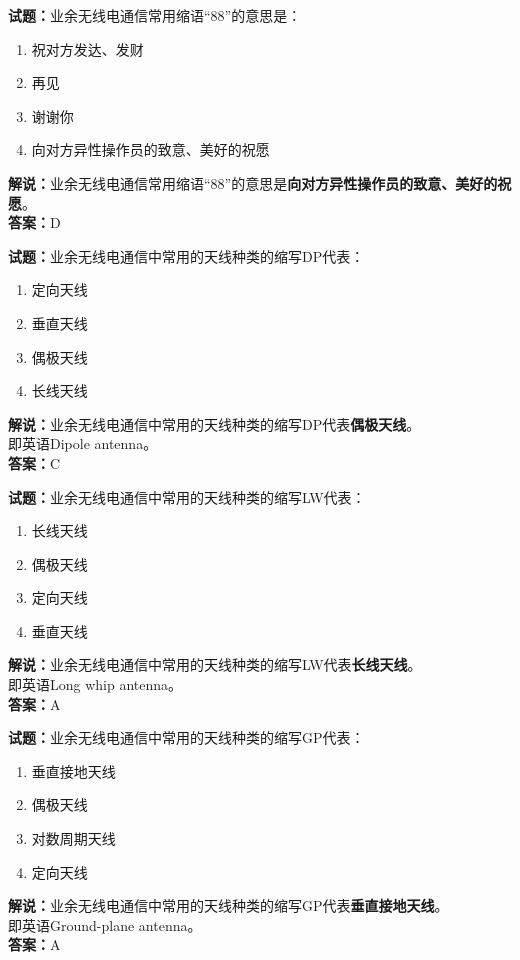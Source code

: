 \documentclass{ctexbook}
\begin{document}
\bigskip


\noindent\textbf{试题：}业余无线电通信常用缩语“88”的意思是：
\begin{enumerate}[leftmargin=3em]
\item 祝对方发达、发财
\item 再见
\item 谢谢你
\item 向对方异性操作员的致意、美好的祝愿
\end{enumerate}
\noindent\textbf{解说：}业余无线电通信常用缩语“88”的意思是\textbf{向对方异性操作员的致意、美好的祝愿}。\\\noindent\textbf{答案：}D



\bigskip


\noindent\textbf{试题：}业余无线电通信中常用的天线种类的缩写DP代表：
\begin{enumerate}[leftmargin=3em]
\item 定向天线
\item 垂直天线
\item 偶极天线
\item 长线天线
\end{enumerate}
\noindent\textbf{解说：}业余无线电通信中常用的天线种类的缩写DP代表\textbf{偶极天线}。\\即英语Dipole antenna。\\\noindent\textbf{答案：}C



\bigskip


\noindent\textbf{试题：}业余无线电通信中常用的天线种类的缩写LW代表：
\begin{enumerate}[leftmargin=3em]
\item 长线天线
\item 偶极天线
\item 定向天线
\item 垂直天线
\end{enumerate}
\noindent\textbf{解说：}业余无线电通信中常用的天线种类的缩写LW代表\textbf{长线天线}。\\即英语Long whip antenna。\\\noindent\textbf{答案：}A



\bigskip


\noindent\textbf{试题：}业余无线电通信中常用的天线种类的缩写GP代表：
\begin{enumerate}[leftmargin=3em]
\item 垂直接地天线
\item 偶极天线
\item 对数周期天线
\item 定向天线
\end{enumerate}
\noindent\textbf{解说：}业余无线电通信中常用的天线种类的缩写GP代表\textbf{垂直接地天线}。\\即英语Ground-plane antenna。\\\noindent\textbf{答案：}A
\end{document}
